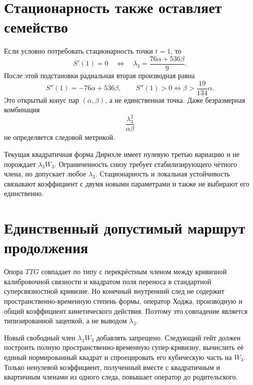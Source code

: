 \section{Стационарность также оставляет семейство}

Если условно потребовать стационарность точки $t=1$, то
\begin{equation}
 S'(1)=0
 \quad\Longleftrightarrow\quad
 \lambda_3=\frac{76\alpha+536\beta}{9}.
 \label{eq:v8-baryon-cubic-coefficient-stationarity}
\end{equation}
После этой подстановки радиальная вторая производная равна
\begin{equation}
 S''(1)=-76\alpha+536\beta,
 \qquad
 S''(1)>0\Longleftrightarrow\beta>\frac{19}{134}\alpha.
 \label{eq:v8-baryon-cubic-coefficient-stability}
\end{equation}
Это открытый конус пар $(\alpha,\beta)$, а не единственная точка. Даже
безразмерная комбинация
\begin{equation}
 \frac{\lambda_3^2}{\alpha\beta}
 \label{eq:v8-baryon-cubic-coefficient-shape-ratio}
\end{equation}
не определяется следовой метрикой.

\begin{theorem}
Текущая квадратичная форма Дирихле имеет нулевую третью вариацию и не
порождает $\lambda_3W_3$. Ограниченность снизу требует стабилизирующего
чётного члена, но допускает любое $\lambda_3$. Стационарность и локальная
устойчивость связывают коэффициент с двумя новыми параметрами и также не
выбирают его единственно.
\end{theorem}

\section{Единственный допустимый маршрут продолжения}

Опора $TTG$ совпадает по типу с перекрёстным членом между кривизной
калибровочной связности и квадратом поля переноса в стандартной
суперсвязностной кривизне. Но конечный внутренний след не содержит
пространственно-временную степень формы, оператор Ходжа, производную и общий
коэффициент кинетического действия. Поэтому это совпадение является
типизированной зацепкой, а не выводом $\lambda_3$.

\begin{nogocriterion}
Новый свободный член $\lambda_3W_3$ добавлять запрещено. Следующий гейт
должен построить полную пространственно-временную супер-кривизну, вычислить
её единый нормированный квадрат и спроецировать его кубическую часть на
$W_3$. Только ненулевой коэффициент, полученный вместе с квадратичным и
квартичным членами из одного следа, повышает оператор до родительского.
\end{nogocriterion}


